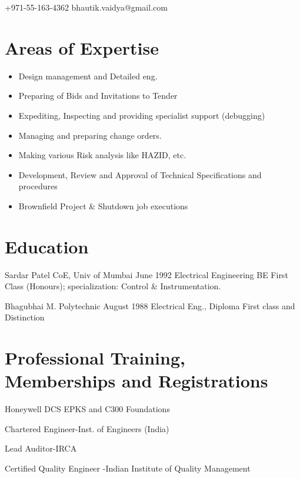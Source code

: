 \documentclass{tccv}
\begin{document}
    {+971-55-163-4362}
    {bhautik.vaidya@gmail.com}
    
\section{Areas of Expertise}

\begin{itemize}
    \item Design management and Detailed eng.
    \item Preparing of Bids and Invitations to Tender
    \item Expediting, Inspecting and providing specialist support (debugging)
    \item Managing and preparing change orders.
    \item Making various Risk analysis like HAZID, etc.
    \item Development, Review and Approval of Technical Specifications and procedures
    \item Brownfield Project \& Shutdown job executions 
\end{itemize}
    


\section{Education}

\begin{yearlist}

\item[Sardar Patel CoE, Univ of Mumbai]{June 1992}
     {Electrical Engineering BE}
     {First Class (Honours); specialization: Control \& Instrumentation.}

\item[Bhagubhai M. Polytechnic]{August 1988}
     {Electrical Eng., Diploma}
     {First class and Distinction}

\end{yearlist}

\section{Professional Training, Memberships and Registrations}

\begin{factlist}
\item{}{Honeywell DCS EPKS and C300 Foundations}
\item{}{Chartered Engineer-Inst. of Engineers (India)}
\item{}{Lead Auditor-IRCA}
\item{}{Certified Quality Engineer -Indian Institute of Quality Management}
\end{factlist}
\end{document}
